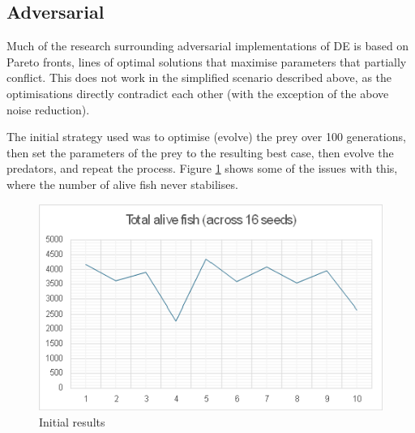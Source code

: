 \documentclass[12pt]{article}
\begin{document}
\subsection{Adversarial}
Much of the research surrounding adversarial implementations of DE is based on Pareto fronts, lines of optimal solutions that maximise parameters that partially conflict. This does not work in the simplified scenario described above, as the optimisations directly contradict each other (with the exception of the above noise reduction).\par
The initial strategy used was to optimise (evolve) the prey over 100 generations, then set the parameters of the prey to the resulting best case, then evolve the predators, and repeat the process. Figure \ref{fig:initial} shows some of the issues with this, where the number of alive fish never stabilises.
\begin{figure}[H]
    \centering
    \includegraphics[width=0.5\linewidth]{fig/initial+results.png}
    \caption{Initial results}
    \label{fig:initial}
\end{figure}
\end{document}
